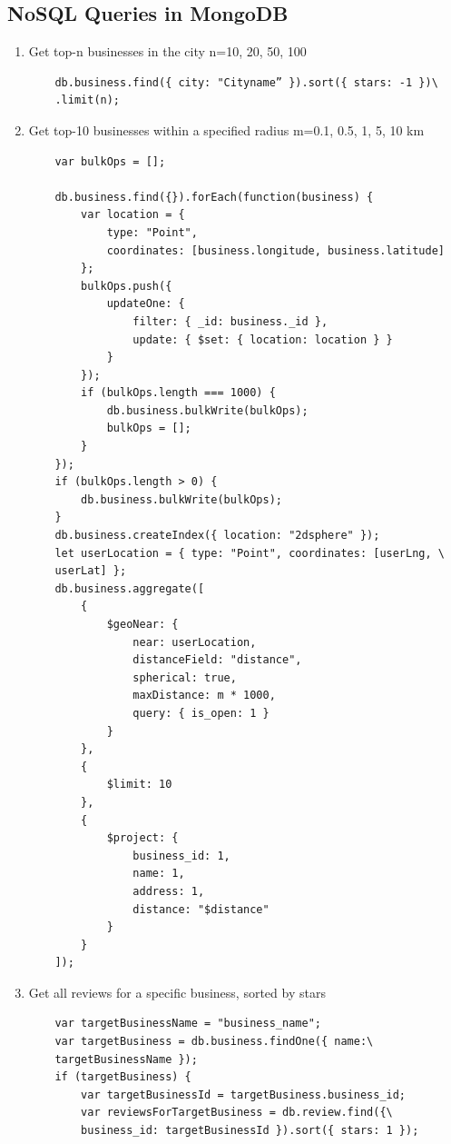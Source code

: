 \documentclass[runningheads]{llncs}
\begin{document}
\subsection{NoSQL Queries in MongoDB}
\begin{enumerate}
    \item Get top-n businesses in the city n=10, 20, 50, 100
    \begin{verbatim}
    db.business.find({ city: "Cityname” }).sort({ stars: -1 })\
    .limit(n);
    \end{verbatim}

    
    \item Get top-10 businesses within a specified radius m=0.1, 0.5, 1, 5, 10 km

    \begin{verbatim}
    var bulkOps = [];
    
    db.business.find({}).forEach(function(business) {
        var location = {
            type: "Point",
            coordinates: [business.longitude, business.latitude]
        };
        bulkOps.push({
            updateOne: {
                filter: { _id: business._id },
                update: { $set: { location: location } }
            }
        });
        if (bulkOps.length === 1000) {
            db.business.bulkWrite(bulkOps);
            bulkOps = [];
        }
    });
    if (bulkOps.length > 0) {
        db.business.bulkWrite(bulkOps);
    }
    db.business.createIndex({ location: "2dsphere" });
    let userLocation = { type: "Point", coordinates: [userLng, \
    userLat] };
    db.business.aggregate([
        {
            $geoNear: {
                near: userLocation,
                distanceField: "distance",
                spherical: true,
                maxDistance: m * 1000,
                query: { is_open: 1 } 
            }
        },
        {
            $limit: 10
        },
        {
            $project: {
                business_id: 1,
                name: 1,
                address: 1,
                distance: "$distance"
            }
        }
    ]);
    \end{verbatim}
    
    \item Get all reviews for a specific business, sorted by stars
    \begin{verbatim}
    var targetBusinessName = "business_name";
    var targetBusiness = db.business.findOne({ name:\
    targetBusinessName });  
    if (targetBusiness) {
        var targetBusinessId = targetBusiness.business_id;
        var reviewsForTargetBusiness = db.review.find({\
        business_id: targetBusinessId }).sort({ stars: 1 });


\end{verbatim}
\end{enumerate}
\end{document}
